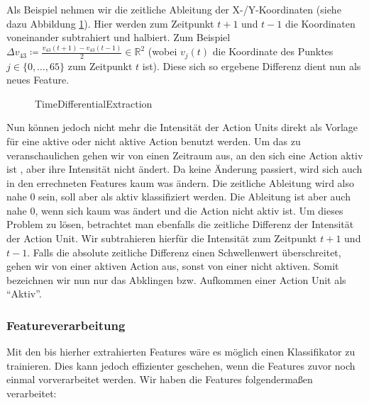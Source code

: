Als Beispiel nehmen wir die zeitliche Ableitung der X-/Y-Koordinaten (siehe dazu Abbildung \ref{fig:timediff}). 
Hier werden zum Zeitpunkt $t+1$ und $t-1$ die Koordinaten voneinander subtrahiert und halbiert. Zum Beispiel $\Delta v_{43} \coloneqq \frac{v_{43}(t+1) - v_{43}(t-1)}{2}\in\mathbb{R}^2$ (wobei $v_{j}(t)$ die Koordinate des Punktes $j\in\{0,\ldots,65\}$ zum Zeitpunkt $t$ ist).
Diese sich so ergebene Differenz dient nun als neues Feature.

\begin{figure}

\caption{TimeDifferentialExtraction}
\label{fig:timediff}
\end{figure}

Nun können jedoch nicht mehr die Intensität der Action Units direkt als Vorlage für eine aktive oder nicht aktive Action benutzt werden. 
Um das zu veranschaulichen gehen wir von einen Zeitraum aus, an den sich eine Action aktiv ist , aber ihre Intensität nicht ändert.
Da keine Änderung passiert, wird sich auch in den errechneten Features kaum was ändern. Die zeitliche Ableitung wird also nahe $0$ sein, soll aber als aktiv klassifiziert werden. Die Ableitung ist aber auch nahe $0$, wenn sich kaum was ändert und die Action nicht aktiv ist.
Um dieses Problem zu lösen, betrachtet man ebenfalls die zeitliche Differenz der Intensität der Action Unit. Wir subtrahieren hierfür die Intensität zum Zeitpunkt $t+1$ und $t-1$. Falls die absolute zeitliche Differenz einen Schwellenwert überschreitet, gehen wir von einer aktiven Action aus, sonst von einer nicht aktiven. Somit bezeichnen wir nun nur das Abklingen bzw. Aufkommen einer Action Unit als "`Aktiv"'.

\subsubsection{Featureverarbeitung}
Mit den bis hierher extrahierten Features wäre es möglich einen Klassifikator zu trainieren. Dies kann jedoch effizienter geschehen,
wenn die Features zuvor noch einmal vorverarbeitet werden. Wir haben die Features folgendermaßen verarbeitet:

